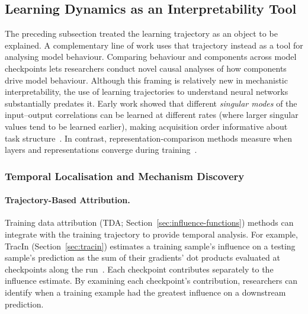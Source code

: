 \subsection{Learning Dynamics as an Interpretability Tool}

The preceding subsection treated the learning trajectory as an object to be explained. A complementary line of work uses that trajectory instead as a tool for analysing model behaviour. Comparing behaviour and components across model checkpoints lets researchers conduct novel causal analyses of how components drive model behaviour. Although this framing is relatively new in mechanistic interpretability, the use of learning trajectories to understand neural networks substantially predates it. Early work showed that different \emph{singular modes} of the input--output correlations can be learned at different rates (where larger singular values tend to be learned earlier), making acquisition order informative about task structure~. In contrast, representation-comparison methods measure when layers and representations converge during training~.

\subsubsection{Temporal Localisation and Mechanism Discovery}
\label{sec:ld-localization}

\paragraph{Trajectory-Based Attribution.} Training data attribution (TDA; Section~\ref{sec:influence-functions}) methods can integrate with the training trajectory to provide temporal analysis. For example, TracIn (Section~\ref{sec:tracin}) estimates a training sample's influence on a testing sample's prediction as the sum of their gradients' dot products evaluated at checkpoints along the run~. Each checkpoint contributes separately to the influence estimate. By examining each checkpoint's contribution, researchers can identify when a training example had the greatest influence on a downstream prediction.

